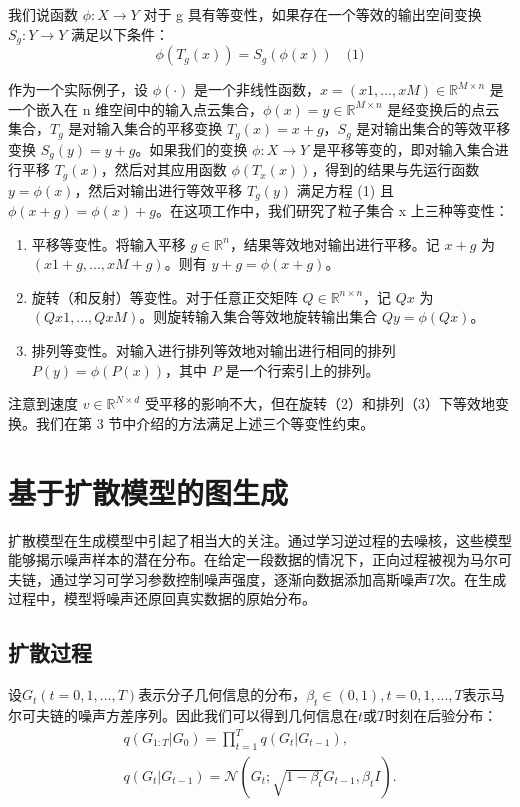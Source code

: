 我们说函数 $\phi: X \rightarrow Y$ 对于 g 具有等变性，如果存在一个等效的输出空间变换 $S_g: Y \rightarrow Y$ 满足以下条件：
\[\phi(T_g(x)) = S_g(\phi(x)) \quad \text{(1)} \]

作为一个实际例子，设 $\phi(\cdot)$ 是一个非线性函数，$x =(x1, ..., xM) \in \mathbb{R}^{M \times n}$ 是一个嵌入在 n 维空间中的输入点云集合，$\phi(x)= y \in \mathbb{R}^{M \times n}$ 是经变换后的点云集合，$T_g$ 是对输入集合的平移变换 $T_g(x)= x + g$，$S_g$ 是对输出集合的等效平移变换 $S_g(y)= y + g$。如果我们的变换 $\phi: X \rightarrow Y$ 是平移等变的，即对输入集合进行平移 $T_g(x)$，然后对其应用函数 $\phi(T_x(x))$，得到的结果与先运行函数 $y = \phi(x)$，然后对输出进行等效平移 $T_g(y)$ 满足方程 (1) 且 $\phi(x+g)= \phi(x)+ g$。在这项工作中，我们研究了粒子集合 x 上三种等变性：
\begin{enumerate}
    \item 平移等变性。将输入平移 $g \in \mathbb{R}^n$，结果等效地对输出进行平移。记 $x+g$ 为 $(x1+g, ..., xM+g)$。则有 $y + g = \phi(x + g)$。
    \item 旋转（和反射）等变性。对于任意正交矩阵 $Q \in \mathbb{R}^{n \times n}$，记 $Qx$ 为 $(Qx1, ...,QxM)$。则旋转输入集合等效地旋转输出集合 $Qy = \phi(Qx)$。
    \item 排列等变性。对输入进行排列等效地对输出进行相同的排列 $P(y)= \phi(P(x))$，其中 $P$ 是一个行索引上的排列。
\end{enumerate}

注意到速度 $v \in \mathbb{R}^{N \times d}$ 受平移的影响不大，但在旋转（2）和排列（3）下等效地变换。我们在第 3 节中介绍的方法满足上述三个等变性约束。

\section{基于扩散模型的图生成}
扩散模型在生成模型中引起了相当大的关注。通过学习逆过程的去噪核，这些模型能够揭示噪声样本的潜在分布。在给定一段数据的情况下，正向过程被视为马尔可夫链，通过学习可学习参数控制噪声强度，逐渐向数据添加高斯噪声$T$次。在生成过程中，模型将噪声还原回真实数据的原始分布。

\subsection{扩散过程}
设$G_t (t=0, 1, ..., T)$表示分子几何信息的分布，$\beta_t \in (0, 1), t=0, 1, ..., T$表示马尔可夫链的噪声方差序列。因此我们可以得到几何信息在$t$或$T$时刻在后验分布：
\begin{eqnarray}
&q(G_{1:T} | G_0) = \prod^T_{t=1} q(G_t | G_{t-1}), & \\
&q(G_t | G_{t-1}) = \mathcal{N}(G_t; \sqrt{1-\beta_t}G_{t-1}, \beta_t I).&
\end{eqnarray}

